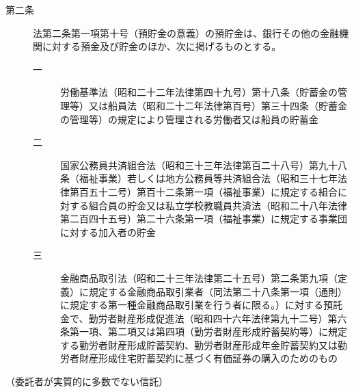 \documentclass[twocolumn,a4j,10pt]{ltjtarticle}
\begin{document}
\begin{description}
\item[第二条]法第二条第一項第十号（預貯金の意義）の預貯金は、銀行その他の金融機関に対する預金及び貯金のほか、次に掲げるものとする。
\begin{description}
\item[一]労働基準法（昭和二十二年法律第四十九号）第十八条（貯蓄金の管理等）又は船員法（昭和二十二年法律第百号）第三十四条（貯蓄金の管理等）の規定により管理される労働者又は船員の貯蓄金
\item[二]国家公務員共済組合法（昭和三十三年法律第百二十八号）第九十八条（福祉事業）若しくは地方公務員等共済組合法（昭和三十七年法律第百五十二号）第百十二条第一項（福祉事業）に規定する組合に対する組合員の貯金又は私立学校教職員共済法（昭和二十八年法律第二百四十五号）第二十六条第一項（福祉事業）に規定する事業団に対する加入者の貯金
\item[三]金融商品取引法（昭和二十三年法律第二十五号）第二条第九項（定義）に規定する金融商品取引業者（同法第二十八条第一項（通則）に規定する第一種金融商品取引業を行う者に限る。）に対する預託金で、勤労者財産形成促進法（昭和四十六年法律第九十二号）第六条第一項、第二項又は第四項（勤労者財産形成貯蓄契約等）に規定する勤労者財産形成貯蓄契約、勤労者財産形成年金貯蓄契約又は勤労者財産形成住宅貯蓄契約に基づく有価証券の購入のためのもの
\end{description}
\end{description}
\noindent\hspace{10pt}（委託者が実質的に多数でない信託）
\end{document}
